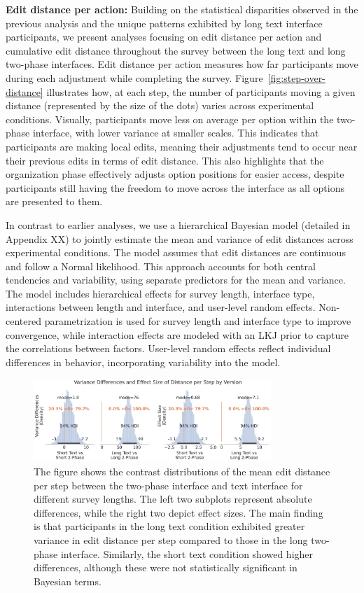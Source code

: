 \textbf{Edit distance per action:} Building on the statistical disparities observed in the previous analysis and the unique patterns exhibited by long text interface participants, we present analyses focusing on edit distance per action and cumulative edit distance throughout the survey between the long text and long two-phase interfaces. Edit distance per action measures how far participants move during each adjustment while completing the survey. Figure~\ref{fig:step-over-distance} illustrates how, at each step, the number of participants moving a given distance (represented by the size of the dots) varies across experimental conditions. Visually, participants move less on average per option within the two-phase interface, with lower variance at smaller scales. This indicates that participants are making local edits, meaning their adjustments tend to occur near their previous edits in terms of edit distance. This also highlights that the organization phase effectively adjusts option positions for easier access, despite participants still having the freedom to move across the interface as all options are presented to them.

In contrast to earlier analyses, we use a hierarchical Bayesian model (detailed in Appendix XX) to jointly estimate the mean and variance of edit distances across experimental conditions. The model assumes that edit distances are continuous and follow a Normal likelihood. This approach accounts for both central tendencies and variability, using separate predictors for the mean and variance. The model includes hierarchical effects for survey length, interface type, interactions between length and interface, and user-level random effects. Non-centered parametrization is used for survey length and interface type to improve convergence, while interaction effects are modeled with an LKJ prior to capture the correlations between factors. User-level random effects reflect individual differences in behavior, incorporating variability into the model.

\begin{figure}[h]
    \centering
    \includegraphics[width=0.8\textwidth]{content/image/distance/distance_diff_per_step_effect_size_by_version.pdf}
    \caption{The figure shows the contrast distributions of the mean edit distance per step between the two-phase interface and text interface for different survey lengths. The left two subplots represent absolute differences, while the right two depict effect sizes. The main finding is that participants in the long text condition exhibited greater variance in edit distance per step compared to those in the long two-phase interface. Similarly, the short text condition showed higher differences, although these were not statistically significant in Bayesian terms.}
    \label{fig:step-over-distance_bayesian}
\end{figure}

